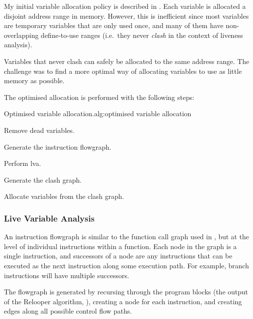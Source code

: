 \documentclass[00-main.tex]{subfiles}
\begin{document}
My initial variable allocation policy is described in .
Each variable is allocated a disjoint address range in memory.
However, this is inefficient since most variables are temporary variables that are only used once, and many of them have non-overlapping define-to-use ranges (i.e.\ they never \emph{clash} in the context of liveness analysis).

Variables that never clash can safely be allocated to the same address range.
The challenge was to find a more optimal way of allocating variables to use as little memory as possible.

The optimised allocation is performed with the following steps:

\begin{Algorithm}{Optimised variable allocation.}{alg:optimised variable allocation}
\begin{EnumerateAlgorithm}
\item Remove dead variables.
\item Generate the instruction flowgraph.
\item Perform \acrlong{lva}.
\item Generate the clash graph.
\item Allocate variables from the clash graph.
\end{EnumerateAlgorithm}
\end{Algorithm}

\subsubsection{Live Variable Analysis}

\newcommand{\lvadef}{\ensuremath{\mathit{def}}}
\newcommand{\lvaref}{\ensuremath{\mathit{ref}}}

An instruction flowgraph is similar to the function call graph used in , but at the level of individual instructions within a function.
Each node in the graph is a single instruction, and successors of a node are any instructions that can be executed as the next instruction along some execution path.
For example, branch instructions will have multiple successors.

The flowgraph is generated by recursing through the program blocks (the output of the Relooper algorithm, ), creating a node for each instruction, and creating edges along all possible control flow paths.
\end{document}
